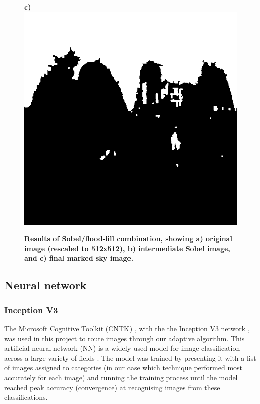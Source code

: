 \documentclass[final,3p,times,authoryear]{elsarticle}
\begin{document}
\begin{figure}
\textbf{c)}\includegraphics[scale=0.27]{Images/2/FloodfillOutput.png}
\caption{\bf   Results of Sobel/flood-fill combination, showing a) original image (rescaled to 512x512), b) intermediate Sobel image, and c) final marked sky image.}    
 \label{fig:sobelflood}  
\end{figure} 

\subsection{Neural network}\label{sec:nn}

\subsubsection{Inception V3}\label{sec:inception}
The Microsoft Cognitive Toolkit (CNTK) \citep{Yu2015,Agarwal2016}, with the the Inception V3 network \citep{Szegedy2015a}, was used in this project to route images through our adaptive algorithm. This artificial neural network (NN) is a widely used model for image classification across a large variety of fields \citep{Xia2017,Hassannejad2016}. The model was trained by presenting it with a list of images assigned to categories (in our case which technique performed most accurately for each image) and running the training process until the model reached peak accuracy (convergence) at recognising images from these classifications.
\end{document}

